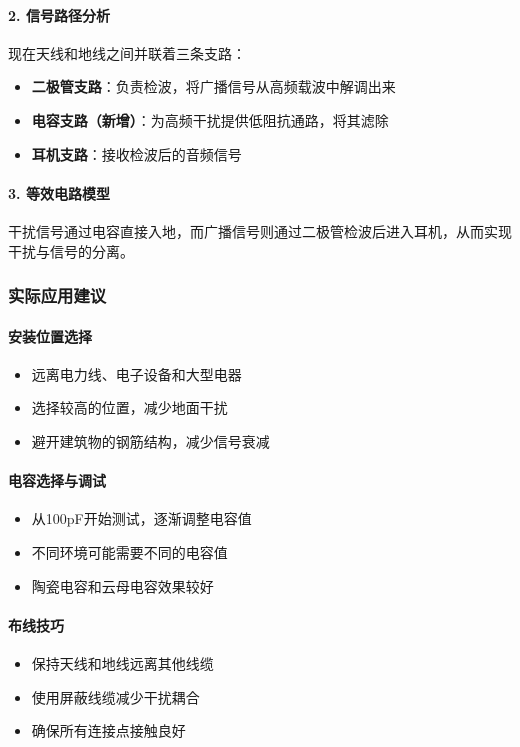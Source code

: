 \documentclass[12pt,UTF8]{ctexbook}
\begin{document}
\paragraph{2. 信号路径分析}
现在天线和地线之间并联着三条支路：
\begin{itemize}
    \item \textbf{二极管支路}：负责检波，将广播信号从高频载波中解调出来
    \item \textbf{电容支路（新增）}：为高频干扰提供低阻抗通路，将其滤除
    \item \textbf{耳机支路}：接收检波后的音频信号
\end{itemize}

\paragraph{3. 等效电路模型}
干扰信号通过电容直接入地，而广播信号则通过二极管检波后进入耳机，从而实现干扰与信号的分离。

\subsubsection{实际应用建议}

\paragraph{安装位置选择}
\begin{itemize}
  \item 远离电力线、电子设备和大型电器
  \item 选择较高的位置，减少地面干扰
  \item 避开建筑物的钢筋结构，减少信号衰减
\end{itemize}

\paragraph{电容选择与调试}
\begin{itemize}
  \item 从100pF开始测试，逐渐调整电容值
  \item 不同环境可能需要不同的电容值
  \item 陶瓷电容和云母电容效果较好
\end{itemize}

\paragraph{布线技巧}
\begin{itemize}
  \item 保持天线和地线远离其他线缆
  \item 使用屏蔽线缆减少干扰耦合
  \item 确保所有连接点接触良好
\end{itemize}
\end{document}
